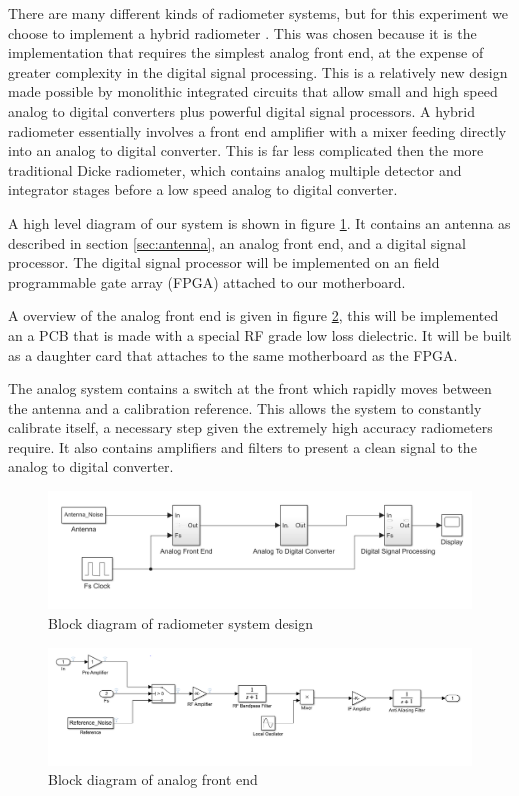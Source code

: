 \documentclass[12pt]{article}
\begin{document}
There are many different kinds of radiometer systems, but for this experiment we choose to implement a hybrid radiometer \cite{skou1989microwave}. This was chosen because it is the implementation that requires the simplest analog front end, at the expense of greater complexity in the digital signal processing. This is a relatively  new design made possible by monolithic integrated circuits that allow small and high speed analog to digital converters plus powerful digital signal processors. A hybrid radiometer essentially involves a front end amplifier with a mixer feeding directly into an analog to digital converter. This is far less complicated then the more  traditional Dicke radiometer, which contains analog multiple detector and integrator stages before a low speed analog to digital converter. 

A high level diagram of our system is shown in figure \ref{fig:system_diagram}. It contains an antenna as described in section \ref{sec:antenna}, an analog front end, and a digital signal processor. The digital signal processor will be implemented on an field programmable gate array (FPGA) attached to our motherboard.

A overview of the analog front end is given in figure \ref{fig:analog_diagram}, this will be implemented an a PCB that is made with a special RF grade low loss dielectric. It will be built as a daughter card that attaches to the same motherboard as the FPGA.

The analog system contains a switch at the front which rapidly moves between the  antenna and a calibration reference. This allows the system to constantly calibrate  itself, a necessary step given the extremely high accuracy radiometers require. It  also contains amplifiers and filters to present a clean signal to the analog to digital converter.
\begin{figure}
	\centering
	\includegraphics[width=\linewidth]{Figures/radiometer_system.png}
	\caption{Block diagram of radiometer system design}
	\label{fig:system_diagram}
\end{figure}

\begin{figure}
	\centering
	\includegraphics[width=\linewidth]{Figures/analog_front_end.png}
	\caption{Block diagram of analog front end}
	\label{fig:analog_diagram}
\end{figure}
\end{document}
